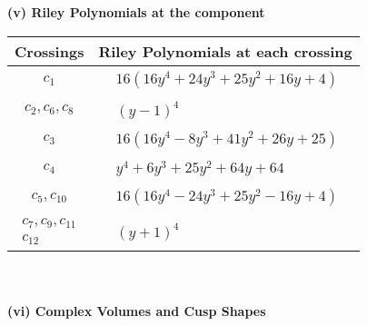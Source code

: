 \documentclass[1p]{elsarticle_modified}
\theoremstyle{definition}
\begin{document}
\newpage\renewcommand{\arraystretch}{1}
\flushleft \textbf{(v) Riley Polynomials at the component}\newline \\
\begin{tabular}{m{50pt}|m{274pt}}
Crossings & \hspace{64pt}Riley Polynomials at each crossing \\
\hline $$\begin{aligned}c_{1}\end{aligned}$$&$\begin{aligned}
&16(16 y^4+24 y^3+25 y^2+16 y+4)
\end{aligned}$\\
\hline $$\begin{aligned}c_{2},c_{6},c_{8}\end{aligned}$$&$\begin{aligned}
&(y-1)^4
\end{aligned}$\\
\hline $$\begin{aligned}c_{3}\end{aligned}$$&$\begin{aligned}
&16(16 y^4-8 y^3+41 y^2+26 y+25)
\end{aligned}$\\
\hline $$\begin{aligned}c_{4}\end{aligned}$$&$\begin{aligned}
&y^4+6 y^3+25 y^2+64 y+64
\end{aligned}$\\
\hline $$\begin{aligned}c_{5},c_{10}\end{aligned}$$&$\begin{aligned}
&16(16 y^4-24 y^3+25 y^2-16 y+4)
\end{aligned}$\\
\hline $$\begin{aligned}c_{7},c_{9},c_{11}\\c_{12}\end{aligned}$$&$\begin{aligned}
&(y+1)^4
\end{aligned}$\\
\hline
\end{tabular}\\~\\
\newpage\flushleft \textbf{(vi) Complex Volumes and Cusp Shapes}
\end{document}
